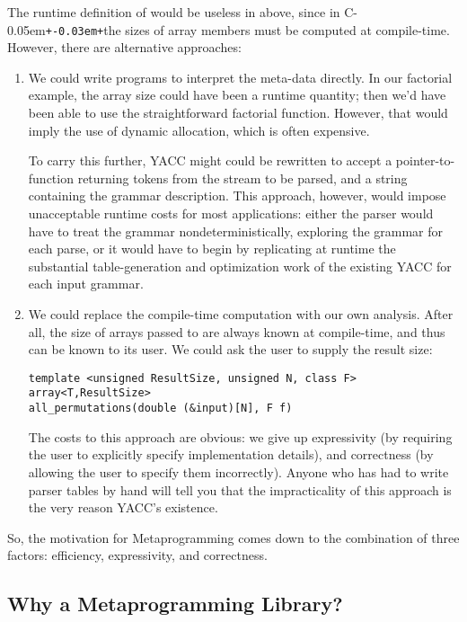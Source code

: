 \documentclass{netobjectdays}
\newcommand{\Cpp}{C\kern-0.05em\texttt{+\kern-0.03em+}}
\begin{document}
The runtime definition of  would be useless in
 above, since in \Cpp the sizes of array
members must be computed at compile-time. However, there are
alternative approaches:

\begin{enumerate}

\item We could write programs to interpret the meta-data directly. In
  our factorial example, the array size could have been a runtime
  quantity; then we'd have been able to use the straightforward
  factorial function. However, that would imply the use of dynamic
  allocation, which is often expensive.

  To carry this further, YACC might could be rewritten to accept a
  pointer-to-function returning tokens from the stream to be parsed,
  and a string containing the grammar description. This approach,
  however, would impose unacceptable runtime costs for most
  applications: either the parser would have to treat the grammar
  nondeterministically, exploring the grammar for each parse, or it
  would have to begin by replicating at runtime the substantial
  table-generation and optimization work of the existing YACC for each
  input grammar.

\item We could replace the compile-time computation with our own
  analysis. After all, the size of arrays passed to
   are always known at compile-time, and
  thus can be known to its user. We could ask the user to supply the
  result size: {\footnotesize
  \begin{verbatim}
template <unsigned ResultSize, unsigned N, class F>
array<T,ResultSize>
all_permutations(double (&input)[N], F f)
  \end{verbatim}
  }
  The costs to this approach are obvious: we give up expressivity (by
  requiring the user to explicitly specify implementation details),
  and correctness (by allowing the user to specify them
  incorrectly). Anyone who has had to write parser tables by hand will
  tell you that the impracticality of this approach is the very reason
  YACC's existence.
\end{enumerate}

So, the motivation for Metaprogramming comes down to the combination
of three factors: efficiency, expressivity, and correctness.

\subsection{Why a Metaprogramming Library?}
\end{document}
